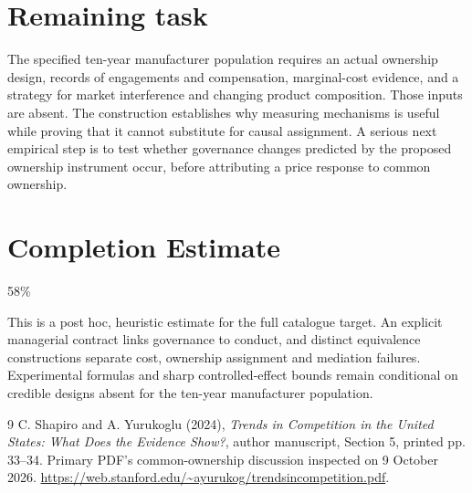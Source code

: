 \documentclass[11pt]{article}
\begin{document}
\section*{Remaining task}
The specified ten-year manufacturer population requires an actual ownership design, records of engagements and compensation, marginal-cost evidence, and a strategy for market interference and changing product composition. Those inputs are absent. The construction establishes why measuring mechanisms is useful while proving that it cannot substitute for causal assignment. A serious next empirical step is to test whether governance changes predicted by the proposed ownership instrument occur, before attributing a price response to common ownership.

\section{Completion Estimate}
58\%

This is a post hoc, heuristic estimate for the full catalogue target.
An explicit managerial contract links governance to conduct, and distinct equivalence constructions separate cost, ownership assignment and mediation failures. Experimental formulas and sharp controlled-effect bounds remain conditional on credible designs absent for the ten-year manufacturer population.

\begin{thebibliography}{9}
 C. Shapiro and A. Yurukoglu (2024), \emph{Trends in Competition in the United States: What Does the Evidence Show?}, author manuscript, Section 5, printed pp. 33--34. Primary PDF's common-ownership discussion inspected on 9 October 2026. \url{https://web.stanford.edu/~ayurukog/trendsincompetition.pdf}.
\end{thebibliography}
\end{document}
